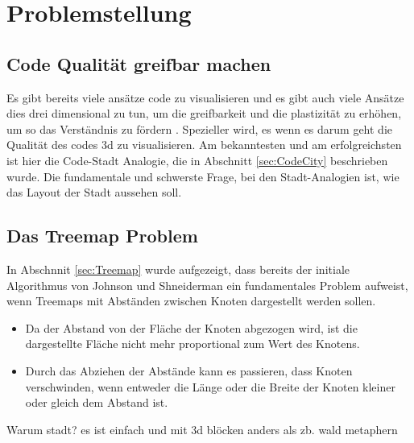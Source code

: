 \section{Problemstellung} \label{sec:Problemstellung}


\subsection{Code Qualität greifbar machen} \label{sec:CodeQualitaetGreifbar}
Es gibt bereits viele ansätze code zu visualisieren und es gibt auch viele Ansätze dies drei dimensional zu tun, um die greifbarkeit und die plastizität zu erhöhen, um so das Verständnis zu fördern \cite{3dsoftwareMarcus,codeCity1,first_3D_vis,virtualButVisibleMunro}. Spezieller wird, es wenn es darum geht die Qualität des codes 3d zu visualisieren. Am bekanntesten und am erfolgreichsten ist hier die Code-Stadt Analogie, die in Abschnitt \ref{sec:CodeCity} beschrieben wurde. Die fundamentale und schwerste Frage, bei den Stadt-Analogien ist, wie das Layout der Stadt aussehen soll.

\subsection{Das Treemap Problem} \label{sec:TreemapProblem}
In Abschnnit \ref{sec:Treemap} wurde aufgezeigt, dass bereits der initiale Algorithmus von Johnson und Shneiderman \cite{johnson1991tree} ein fundamentales Problem aufweist, wenn Treemaps mit Abständen zwischen Knoten dargestellt werden sollen. 
\begin{itemize}
    \item Da der Abstand von der Fläche der Knoten abgezogen wird, ist die dargestellte Fläche nicht mehr proportional zum Wert des Knotens.
    \item Durch das Abziehen der Abstände kann es passieren, dass Knoten verschwinden, wenn entweder die Länge oder die Breite der Knoten kleiner oder gleich dem Abstand ist.
\end{itemize}


Warum stadt? es ist einfach und mit 3d blöcken anders als zb. wald metaphern\cite{softwareForest}